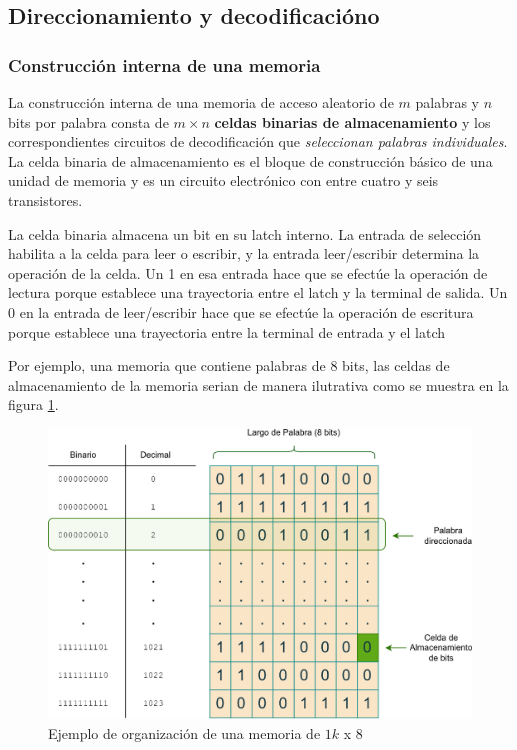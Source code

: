 \subsection{Direccionamiento y decodificacióno}

\subsubsection{Construcción interna de una memoria}

La construcción interna de una memoria de acceso aleatorio de $m$ palabras y $n$ bits por palabra consta de $m \times n$ \textbf{celdas binarias de almacenamiento} y los correspondientes circuitos de decodificación que \textit{seleccionan palabras individuales}. La celda binaria de almacenamiento es el bloque de construcción básico de una unidad de memoria y es un circuito electrónico con entre cuatro y seis transistores. 

La celda binaria almacena un bit en su latch interno. La entrada de selección habilita a la celda para leer o escribir, y la entrada leer/escribir determina la operación de la celda. Un 1 en esa entrada hace que se efectúe la operación de lectura porque establece una trayectoria entre el latch y la terminal de salida. Un 0 en la entrada de leer/escribir hace que se efectúe la operación de escritura porque establece una trayectoria entre la terminal de entrada y el latch

Por ejemplo, una memoria que contiene palabras de $8$ bits, las celdas de almacenamiento de la memoria serian de manera ilutrativa como se muestra en la figura \ref{fig:memfoto2}.

\begin{figure}[h]
\centering
\includegraphics[scale=0.84]{img/memorias.eps}
\caption{Ejemplo de organización de una memoria de $1k$ x $8$}
\label{fig:memfoto2}
\end{figure}

